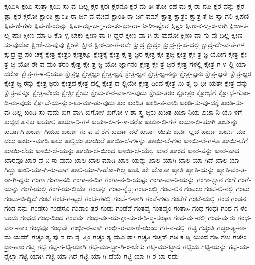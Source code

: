 {ಕ್ಷಯಿಸಿ
ಕ್ಷಯಿ-ಸುತ್ತಾ
ಕ್ಷಯಿ-ಸು-ವು-ದಿಲ್ಲ
ಕ್ಷರ
ಕ್ಷರಃ
ಕ್ಷರನೂ
ಕ್ಷರ-ಮ-ತೀ-ತೋ-ಽಹ-ಮ-ಕ್ಷ-ರಾ-ದಪಿ
ಕ್ಷರ-ವನ್ನು
ಕ್ಷರ-ಶ್ಚಾ-ಕ್ಷರ
ಕ್ಷರೋ
ಕ್ಷಾಂತಿ
ಕ್ಷಾಂತಿ-ರಾ-ರ್ಜ-ವ-ಮೇವ
ಕ್ಷಾಂತಿ-ರಾ-ರ್ಜ-ವಮ್
ಕ್ಷಾತ್ರ
ಕ್ಷಾತ್ರಂ
ಕ್ಷಾತ್ರ-ತೆ-ಜ-ಸ್ಸಾ-ಗಲಿ
ಕ್ಷಿಪಣಿ
ಕ್ಷಿಪ-ಣಿ-ಗಳು
ಕ್ಷಿಪ-ಣಿ-ಯನ್ನು
ಕ್ಷಿಪಾ-ಮ್ಯ-ಜ-ಸ್ರ-ಮ-ಶು-ಭಾ-ನಾ-ಸು-ರೀ-ಷ್ವೇವ
ಕ್ಷಿಪ್ರಂ
ಕ್ಷೀಣ-ಕ-ಲ್ಮ-ಶ-ರಾಗಿ
ಕ್ಷೀಣ-ಕ-ಲ್ಮ-ಷಾಃ
ಕ್ಷೀಣ-ಮಾ-ಡಿ-ಕೊ-ಳ್ಳ-ಬೇಕು
ಕ್ಷೀಣ-ವಾ-ಗಿ-ದ್ದರೆ
ಕ್ಷೀಣ-ವಾ-ಗಿ-ರು-ವುದೋ
ಕ್ಷೀಣ-ವಾ-ಗು-ವು-ದಿಲ್ಲ
ಕ್ಷೀಣಿ-ಸು-ವುದೋ
ಕ್ಷೀಣಿ-ಸು-ವುವು
ಕ್ಷೀಣೇ
ಕ್ಷೀರ
ಕ್ಷೀರ-ಸಾ-ಗ-ರವೇ
ಕ್ಷುದ್ರ
ಕ್ಷುದ್ರಂ
ಕ್ಷುದ್ರ-ಗ್ರ-ಹ-ದಲ್ಲಿ
ಕ್ಷುದ್ರ-ದೇ-ವ-ತೆ-ಗಳ
ಕ್ಷುದ್ರ-ಪ್ರ-ಪಂ-ಚಕ್ಕೆ
ಕ್ಷೇತ್ರ
ಕ್ಷೇತ್ರಂ
ಕ್ಷೇತ್ರಕ್ಕೂ
ಕ್ಷೇತ್ರಕ್ಕೆ
ಕ್ಷೇತ್ರ-ಕ್ಷೆ-ತ್ರ-ಜ್ಞರ
ಕ್ಷೇತ್ರ-ಕ್ಷೇ-ತ್ರಜ್ಞ
ಕ್ಷೇತ್ರ-ಕ್ಷೇ-ತ್ರ-ಜ್ಞ-ಯೋಗ
ಕ್ಷೇತ್ರ-ಕ್ಷೇ-ತ್ರ-ಜ್ಞ-ಯೋ-ರೇ-ವ-ಮಂ-ತರಂ
ಕ್ಷೇತ್ರ-ಕ್ಷೇ-ತ್ರ-ಜ್ಞ-ಯೋ-ರ್ಜ್ಞಾನಂ
ಕ್ಷೇತ್ರ-ಕ್ಷೇ-ತ್ರ-ಜ್ಞರ
ಕ್ಷೇತ್ರ-ಗಳಲ್ಲಿ
ಕ್ಷೇತ್ರ-ಗ-ಳ-ಲ್ಲಿ-ಯಾ-ದರೋ
ಕ್ಷೇತ್ರ-ಗ-ಳ-ಲ್ಲಿಯೂ
ಕ್ಷೇತ್ರಜ್ಞ
ಕ್ಷೇತ್ರಜ್ಞಂ
ಕ್ಷೇತ್ರ-ಜ್ಞಕ್ಕೆ
ಕ್ಷೇತ್ರ-ಜ್ಞನ
ಕ್ಷೇತ್ರ-ಜ್ಞ-ನನ್ನು
ಕ್ಷೇತ್ರ-ಜ್ಞನು
ಕ್ಷೇತ್ರ-ಜ್ಞನೇ
ಕ್ಷೇತ್ರ-ಜ್ಞರ
ಕ್ಷೇತ್ರ-ಜ್ಞ-ರನ್ನು
ಕ್ಷೇತ್ರ-ಜ್ಞರು
ಕ್ಷೇತ್ರದ
ಕ್ಷೇತ್ರ-ದಲ್ಲಿ
ಕ್ಷೇತ್ರ-ದ-ಲ್ಲಿಯೇ
ಕ್ಷೇತ್ರ-ದಿಂದ
ಕ್ಷೇತ್ರ-ಮಿ-ತ್ಯ-ಭಿ-ಧೀ-ಯತೇ
ಕ್ಷೇತ್ರ-ವನ್ನು
ಕ್ಷೇತ್ರ-ವನ್ನೂ
ಕ್ಷೇತ್ರ-ವೆಂದು
ಕ್ಷೇತ್ರೀ
ಕ್ಷೇಮ
ಕ್ಷೇಮ-ಕ-ರ-ವಾ-ಗು-ವುದು
ಕ್ಷೇಮ-ತರಂ
ಕ್ಷೋತ್ರಂ
ಕ್ಷೋಭೆಗೆ
ಕ್ಷೋಭೆ-ಗೊಂ-ಡಿ-ರು-ವುದು
ಕ್ಷೋಭೆ-ಯ-ನ್ನುಂ-ಟು-ಮಾ-ಡು-ವುದು
ಖಂ
ಖಂಡಿತ
ಖಂಡಿ-ತ-ವಾದಿ
ಖಂಡಿ-ಸು-ವು-ದಕ್ಕೆ
ಖಂಡಿ-ಸು-ವು-ದಿಲ್ಲ
ಖಂಡಿ-ಸು-ವುದು
ಖಗ-ವಾಗಿ
ಖಗೋಳ
ಖಗೋ-ಳ-ಶಾ-ಸ್ತ್ರ-ಜ್ಞರು
ಖಚಿತ
ಖಜಾ-ನಿಯ
ಖಜಾ-ನಿ-ಯೊ-ಳಗೆ
ಖಡ್ಗದ
ಖನಿಜ
ಖಯಾಲಿ
ಖಯಾ-ಲಿ-ಗಳ
ಖಯಾ-ಲಿ-ಗ-ಳಾ-ದರೊ
ಖಯಾ-ಲಿ-ಗಳೆ
ಖಯಾ-ಲಿ-ಯಾಗಿ
ಖರ್ಚನ್ನು
ಖರ್ಚಾಗಿ
ಖರ್ಚಾ-ಗಿಯೂ
ಖರ್ಚಾ-ಗು-ವ-ವ-ರೆಗೆ
ಖರ್ಚಾ-ದರೆ
ಖರ್ಚಾ-ಯಿತು
ಖರ್ಚಿ-ಲ್ಲದ
ಖರ್ಚು
ಖರ್ಚು-ಮಾ-ಡಲು
ಖರ್ಚು-ಮಾಡಿ
ಖಲು
ಖಲ್ವಿದಂ
ಖಾಯಿಲೆ
ಖಾಯಿ-ಲೆ-ಗಳನ್ನು
ಖಾಯಿ-ಲೆ-ಗಳು
ಖಾಯಿ-ಲೆ-ಗಳೂ
ಖಾಯಿ-ಲೆಗೆ
ಖಾಯಿ-ಲೆಯ
ಖಾಯಿ-ಲೆ-ಯನ್ನು
ಖಾಯಿ-ಲೆ-ಯಿಂದ
ಖಾಯಿ-ಲೆ-ಯೆಲ್ಲ
ಖಾರ
ಖಾರದ
ಖಾರ-ವನ್ನು
ಖಾರ-ವಾದ
ಖಾರವೂ
ಖಾರ-ವೆ-ನಿ-ಸು-ವುದು
ಖಾಲಿ
ಖಾಲಿ-ಮಾಡಿ
ಖಾಲಿ-ಯನ್ನು
ಖಾಲಿ-ಯಾಗಿ
ಖಾಲಿ-ಯಾ-ಗಿದೆ
ಖಾಲಿ-ಯಾ-ಗಿದ್ದು
ಖಾಲಿ-ಯಾ-ಗಿ-ರು-ವಾಗ
ಖಾಲಿ-ಯಾ-ಗಿ-ಹೋ-ಗಿಲ್ಲ
ಖುಷಿ
ಖೇ
ಖೋತಾ
ಖ್ಯಾತಿ
ಖ್ಯಾತಿ-ಯನ್ನು
ಖ್ಯಾತಿ-ವಂ-ತ-ರಾ-ಗಿ-ದ್ದರು
ಗಂಗಾ
ಗಂಗಾ-ನದಿ
ಗಂಗಾ-ನ-ದಿಗೆ
ಗಂಗಾ-ನ-ದಿ-ಯಷ್ಟು
ಗಂಗಾ-ವಾ-ರಿ-ಯನ್ನು
ಗಂಗಾ-ಸ್ನಾನ
ಗಂಗೆ
ಗಂಗೆ-ಯನ್ನು
ಗಂಗೆ-ಯಲ್ಲಿ
ಗಂಗೆ-ಯ-ಲ್ಲಿಯೇ
ಗಂಟನ್ನು
ಗಂಟ-ನ್ನೆಲ್ಲ
ಗಂಟ-ಲಲ್ಲಿ
ಗಂಟ-ಲಿನ
ಗಂಟಲು
ಗಂಟಿ-ಲಿ-ನಲ್ಲಿ
ಗಂಟು
ಗಂಟು-ಬಿ-ದ್ದಿದೆ
ಗಂಟೆ
ಗಂಟೆ-ಗ-ಟ್ಟಲೆ
ಗಂಟೆ-ಗಳಲ್ಲಿ
ಗಂಟೆ-ಗ-ಳಾಗಿ
ಗಂಟೆ-ಗಳು
ಗಂಟೆಗೆ
ಗಂಟೆ-ಯಲ್ಲಿ
ಗಂಡ
ಗಂಡನ
ಗಂಡ-ನನ್ನು
ಗಂಡಸು
ಗಂಡಸೊ
ಗಂಡಾಂ-ತರ
ಗಂಡು
ಗಂಡೆದೆ
ಗಂತವ್ಯ
ಗಂತವ್ಯಂ
ಗಂತಾಸಿ
ಗಂಧ
ಗಂಧಃ
ಗಂಧ-ಗ-ಳೆಂ-ಬುದು
ಗಂಧದ
ಗಂಧ-ದಿಂದ
ಗಂಧರ್ವ
ಗಂಧ-ರ್ವ-ಯ-ಕ್ಷಾ-ಸು-ರ-ಸಿ-ದ್ಧ-ಸಂಘಾ
ಗಂಧ-ರ್ವ-ರಲ್ಲಿ
ಗಂಧ-ರ್ವರು
ಗಂಧ-ರ್ವಾ-ಣಾಂ
ಗಂಧವೂ
ಗಂಧವೇ
ಗಂಭೀ-ರ-ವಾಗಿ
ಗಂಭೀ-ರ-ವಾ-ಣಿ-ಯಿಂದ
ಗಗ-ನ-ದಲ್ಲಿ
ಗಚ್ಛ
ಗಚ್ಛಂತಿ
ಗಚ್ಛಂ-ತ್ಯ-ನಾ-ಮ-ಯಮ್
ಗಚ್ಛಂ-ತ್ಯ-ಪು-ನ-ರಾ-ವೃ-ತ್ತಿಂ
ಗಚ್ಛಂ-ತ್ಯ-ಮೂ-ಢಾಃ
ಗಚ್ಛತಿ
ಗಚ್ಛನ್
ಗಜ-ಕ-ಡ್ಡಿ-ಯಿಂದ
ಗಜ-ಗಳು
ಗಜೇಂ-ದ್ರಾ-ಣಾಂ
ಗಟ್ಚಿ
ಗಟ್ಟಿ
ಗಟ್ಟಿ-ಗ-ಟ್ಟಿ-ಯಾಗಿ
ಗಟ್ಟಿ-ಮು-ಟ್ಟಾ-ಗಿ-ರ-ಬೇಕು
ಗಟ್ಟಿ-ಮು-ಟ್ಟಾದ
ಗಟ್ಟಿಯ
ಗಟ್ಟಿ-ಯನ್ನು
ಗಟ್ಟಿ-ಯ-ನ್ನೆಲ್ಲಾ
ಗಟ್ಟಿ-ಯಾಗಿ
ಗಟ್ಟಿ-ಯಾ-ಗಿದೆ
ಗಟ್ಟಿ-ಯಾ-ಗಿ-ದೆಯೆ
ಗಟ್ಟಿ-ಯಾ-ಗಿ-ರ-ಬಾ-ರದು
}
